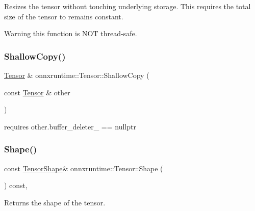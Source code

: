 Resizes the tensor without touching underlying storage. This requires the total size of the tensor to remains constant. \begin{DoxyWarning}{Warning}
this function is N\+OT thread-\/safe. 
\end{DoxyWarning}
\mbox{\label{classonnxruntime_1_1Tensor_afcd8a954ac21fb11ceb3652883493511}} 
\subsubsection{\texorpdfstring{Shallow\+Copy()}{ShallowCopy()}}
{\footnotesize\ttfamily \mbox{\hyperlink{classonnxruntime_1_1Tensor}{Tensor}} \& onnxruntime\+::\+Tensor\+::\+Shallow\+Copy (\begin{DoxyParamCaption}\item[{const \mbox{\hyperlink{classonnxruntime_1_1Tensor}{Tensor}} \&}]{other }\end{DoxyParamCaption})}



requires other.\+buffer\+\_\+deleter\+\_\+ == nullptr 

\mbox{\label{classonnxruntime_1_1Tensor_a35f659dde537304b2492b7c0bec8a7b4}} 
\subsubsection{\texorpdfstring{Shape()}{Shape()}}
{\footnotesize\ttfamily const \mbox{\hyperlink{classonnxruntime_1_1TensorShape}{Tensor\+Shape}}\& onnxruntime\+::\+Tensor\+::\+Shape (\begin{DoxyParamCaption}{ }\end{DoxyParamCaption}) const\hspace{0.3cm}{\ttfamily [inline]}, {\ttfamily [noexcept]}}

Returns the shape of the tensor. \mbox{\label{classonnxruntime_1_1Tensor_aad4466a12c085d4f49bfa099c02a13c3}} 
